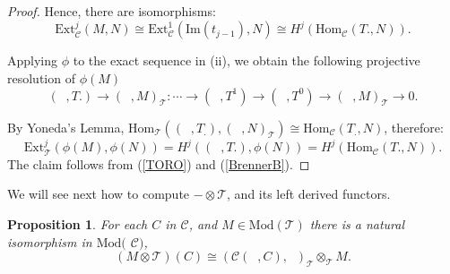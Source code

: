 \documentclass{amsart}
\theoremstyle{plain}
\newtheorem{proposition}{Proposition}
\numberwithin{equation}{section}
\begin{document}
\begin{proof}
Hence, there are isomorphisms:
\begin{equation}  \label{BrennerB}
\mathrm{Ext}_{\mathcal{C}}^{j}(M,N)\cong \mathrm{Ext}^{1}_{\mathcal{C}}(\mathrm{Im}(t_{j-1}),N)\cong H^{j}(\mathrm{Hom}_{\mathcal{C}}(T.,N))\text{.}
\end{equation}

Applying $\phi $ to the exact sequence in (ii), we obtain the following
projective resolution of $\phi (M)$
\begin{equation*}
(\;\;,T.)\rightarrow (\;\;,M)_{\mathcal{T}}:\cdots \rightarrow
(\;\;,T^{1})\rightarrow (\;\;,T^{0})\rightarrow (\;\;,M)_{\mathcal{T}}\rightarrow 0\text{.}
\end{equation*}

By Yoneda's Lemma, $\mathrm{Hom}_{\mathcal{T}}((\;\;,T_{.}),(\;\;,N)_\mathcal{T})\cong \mathrm{Hom}_{\mathcal{C}}(T_{.},N)$, therefore:
\begin{equation}
\mathrm{Ext}_{\mathcal{T}}^{j}(\phi (M),\phi (N))=H^{j}((\;\;,T.),\phi
(N))=H^{j}(\mathrm{Hom}_\mathcal{C}(T.,N))\text{.}  \label{TORO}
\end{equation}The claim follows from (\ref{TORO}) and (\ref{BrennerB}).
\end{proof}

We will see next how to compute $-\otimes \mathcal{T}$, and its left derived
functors.

\begin{proposition}
\label{BB1} For each $C$ in $\mathcal{C}$, and $M\in \mathrm{\mathrm{Mod}}(\mathcal{T})$ there is a natural isomorphism in $\mathrm{Mod}($ $\mathcal{C)}
$,
\begin{equation*}
(M\otimes \mathcal{T})(C)\cong (\mathcal{C}(\;\;,C),\;\;)_{\mathcal{T}}\otimes _{\mathcal{T}}M\text{.}
\end{equation*}
\end{proposition}
\end{document}
